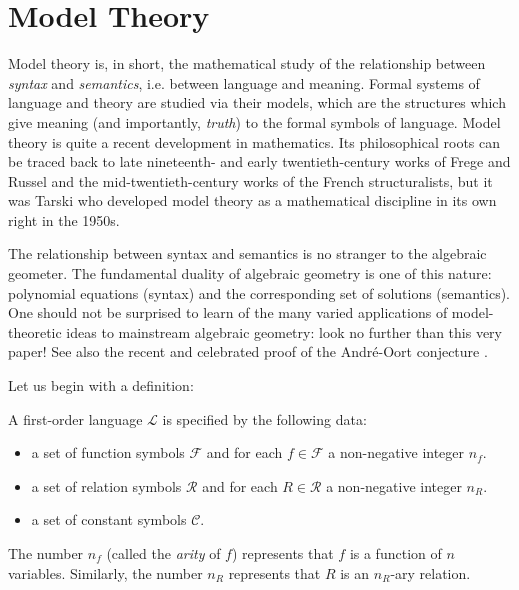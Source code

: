 \section{Model Theory}
Model theory is, in short, the mathematical study of the relationship between \emph{syntax} and \emph{semantics}, i.e. between language and meaning. Formal systems of language and theory are studied via their models, which are the structures which give meaning (and importantly, \emph{truth}) to the formal symbols of language. Model theory is quite a recent development in mathematics. Its philosophical roots can be traced back to late nineteenth- and early twentieth-century works of Frege and Russel and the mid-twentieth-century works of the French structuralists, but it was Tarski who developed model theory as a mathematical discipline in its own right in the 1950s.

The relationship between syntax and semantics is no stranger to the algebraic geometer. The fundamental duality of algebraic geometry is one of this nature: polynomial equations (syntax) and the corresponding set of solutions (semantics). One should not be surprised to learn of the many varied applications of model-theoretic ideas to mainstream algebraic geometry: look no further than this very paper! See also the recent and celebrated proof of the Andr\'e-Oort conjecture \cite{pila2022canonical}.

Let us begin with a definition:

\begin{definition}
A first-order language $\mathcal{L}$ is specified by the following data:
\begin{itemize}
	\item a set of function symbols $\mathcal{F}$ and for each $f\in \mathcal{F}$ a non-negative integer $n_f$.
	\item a set of relation symbols $\mathcal{R}$ and for each $R\in \mathcal{R}$ a non-negative integer $n_R$.
	\item a set of constant symbols $\mathcal{C}$.
\end{itemize}
The number $n_f$ (called the \emph{arity} of $f$) represents that $f$ is a function of $n$ variables. Similarly, the number $n_R$ represents that $R$ is an $n_R$-ary relation.
\end{definition}

